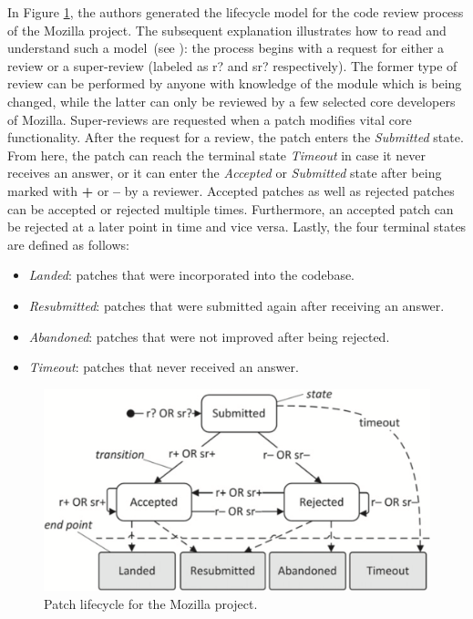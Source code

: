 \documentclass[conference]{IEEEtran}
\begin{document}
In Figure \ref{fig:example_model}, the authors generated the lifecycle model for the code review process of the Mozilla project. The subsequent explanation illustrates how to read and understand such a model~(see \cite{baysal2015synthesizing}): the process begins with a request for either a review or a super-review (labeled as r? and sr? respectively). The former type of review can be performed by anyone with knowledge of the module which is being changed, while the latter can only be reviewed by a few selected core developers of Mozilla. Super-reviews are requested when a patch modifies vital core functionality. After the request for a review, the patch enters the \textit{Submitted} state. From here, the patch can reach the terminal state \textit{Timeout} in case it never receives an answer, or it can enter the \textit{Accepted} or \textit{Submitted} state after being marked with \textbf{+} or \textbf{--} by a reviewer. Accepted patches as well as rejected patches can be accepted or rejected multiple times. Furthermore, an accepted patch can be rejected at a later point in time and vice versa. Lastly, the four terminal states are defined as follows:

\begin{itemize}
    \item \textit{Landed}: patches that were incorporated into the codebase.
    \item \textit{Resubmitted}: patches that were submitted again after receiving an answer.
    \item \textit{Abandoned}: patches that were not improved after being rejected.
    \item \textit{Timeout}: patches that never received an answer.
\end{itemize}

\begin{figure}
    \centering
    \includegraphics[scale=0.15]{img/example_lifecycle_model.png}
    \caption{Patch lifecycle for the Mozilla project\cite{baysal2015synthesizing}.}
    \label{fig:example_model}
\end{figure}
\end{document}
